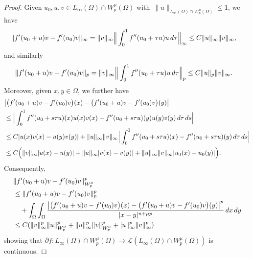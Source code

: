 \documentclass[10pt,a4paper]{amsart}
\newcommand{\kL}{\mathcal{L}}
\begin{document}
\begin{proof}
 Given $u_0,u,v\in L_\infty(\Omega)\cap W^\mu_p(\Omega)$ with~$\|u\|_{L_\infty(\Omega)\cap W^\mu_p(\Omega)}\leq 1$, we have
 \begin{align*}
\|f'(u_0+u)v-f'(u_0)v\|_\infty&=\|v\|_\infty\Big\|\int_0^1 f''(u_0+\tau u)u\, {\rm d}\tau\Big\|_\infty\leq C\|u\|_ \infty\|v\|_ \infty,
\end{align*}
and similarly
 \begin{align*}
\|f'(u_0+u)v-f'(u_0)v\|_p&=\|v\|_\infty\Big\|\int_0^1 f''(u_0+\tau u)u\, {\rm d}\tau\Big\|_p\leq C\|u\|_p\|v\|_ \infty.
\end{align*}
Moreover, given $x,y\in\Omega$, we further have
\begin{align*}
&\big|\big(f'(u_0+u)v-f'(u_0)v\big)(x)-\big(f'(u_0+u)v-f'(u_0)v\big)(y)\big|\\
&\leq\Big|\int_0^1 f''(u_0+s\tau u)(x)u(x)v(x)-f''(u_0+s\tau u)(y)u(y)v(y)\, {\rm d}\tau\, {\rm d}s\Big|\\
&\leq C|u(x)v(x)-u(y)v(y)|+\|u\|_\infty\|v\|_\infty\Big|\int_0^1 f''(u_0+s\tau u)(x)-f''(u_0+s\tau u)(y)\, {\rm d}\tau\, {\rm d}s\Big|\\
&\leq C\Big(\|v\|_\infty|u(x)-u(y)|+\|u\|_\infty|v(x)-v(y)|+\|u\|_\infty\|v\|_\infty|u_0(x)-u_0(y)|\Big).
\end{align*}
Consequently,
\begin{align*}
&\|f'(u_0+u)v-f'(u_0)v\|_{W_p^\mu}^p\\
&\leq\|f'(u_0+u)v-f'(u_0)v\|_p^p\\
&\quad+\int_\Omega\int_\Omega \frac{\big|\big(f'(u_0+u)v-f'(u_0)v\big)(x)-\big(f'(u_0+u)v-f'(u_0)v\big)(y)\big|^p}{|x-y|^{n+\mu p}}\,{\rm d} x\,{\rm d} y\\
&\leq C(\|v\|_\infty^p\|u\|_{W_p^\mu}^p+\|u\|_ \infty^p\|v\|_{W_p^\mu}^p+|u\|_ \infty^p\|v\|_ \infty^{p})
\end{align*}
showing that  $\partial f:L_\infty(\Omega)\cap W^\mu_p(\Omega)\to\kL(L_\infty(\Omega)\cap W^\mu_p(\Omega))$  is continuous.
\end{proof}
\end{document}
